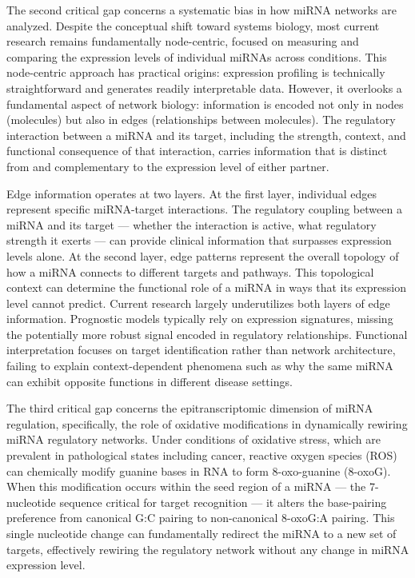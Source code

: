 The second critical gap concerns a systematic bias in how miRNA networks are analyzed. Despite the conceptual shift toward systems biology, most current research remains fundamentally node-centric, focused on measuring and comparing the expression levels of individual miRNAs across conditions. This node-centric approach has practical origins: expression profiling is technically straightforward and generates readily interpretable data. However, it overlooks a fundamental aspect of network biology: information is encoded not only in nodes (molecules) but also in edges (relationships between molecules). The regulatory interaction between a miRNA and its target, including the strength, context, and functional consequence of that interaction, carries information that is distinct from and complementary to the expression level of either partner.

Edge information operates at two layers. At the first layer, individual edges represent specific miRNA-target interactions. The regulatory coupling between a miRNA and its target --- whether the interaction is active, what regulatory strength it exerts --- can provide clinical information that surpasses expression levels alone. At the second layer, edge patterns represent the overall topology of how a miRNA connects to different targets and pathways. This topological context can determine the functional role of a miRNA in ways that its expression level cannot predict. Current research largely underutilizes both layers of edge information. Prognostic models typically rely on expression signatures, missing the potentially more robust signal encoded in regulatory relationships. Functional interpretation focuses on target identification rather than network architecture, failing to explain context-dependent phenomena such as why the same miRNA can exhibit opposite functions in different disease settings.

The third critical gap concerns the epitranscriptomic dimension of miRNA regulation, specifically, the role of oxidative modifications in dynamically rewiring miRNA regulatory networks. Under conditions of oxidative stress, which are prevalent in pathological states including cancer, reactive oxygen species (ROS) can chemically modify guanine bases in RNA to form 8-oxo-guanine (8-oxoG). When this modification occurs within the seed region of a miRNA --- the 7-nucleotide sequence critical for target recognition --- it alters the base-pairing preference from canonical G:C pairing to non-canonical 8-oxoG:A pairing. This single nucleotide change can fundamentally redirect the miRNA to a new set of targets, effectively rewiring the regulatory network without any change in miRNA expression level.


